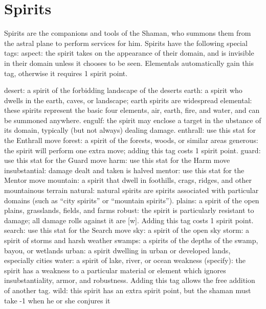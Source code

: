 


\section{Spirits}

Spirits are the companions and tools of the Shaman, who summons them from the astral plane to perform services for him. Spirits have the following special tags: aspect: the spirit takes on the appearance of their domain, and is invisible in their domain unless it chooses to be seen. Elementals automatically gain this tag, otherwise it requires 1 spirit point.

desert: a spirit of the forbidding landscape of the deserts
earth: a spirit who dwells in the earth, caves, or landscape; earth spirits are widespread
elemental: these spirits represent the basic four elements, air, earth, fire, and water, and can be summoned anywhere.
engulf: the spirit may enclose a target in the ubstance of its domain, typically (but not always) dealing damage.
enthrall: use this stat for the Enthrall move
forest: a spirit of the forests, woods, or similar areas
generous: the spirit will perform one extra move; adding this tag costs 1 spirit point.
guard: use this stat for the Guard move
harm: use this stat for the Harm move
insubstantial: damage dealt and taken is halved
mentor: use this stat for the Mentor move
mountain: a spirit that dwell in foothills, crags, ridges, and other mountainous terrain
natural: natural spirits are spirits associated with particular domains (such as “city spirits” or “mountain spirits”).
plains: a spirit of the open plains, grasslands, fields, and farms
robust: the spirit is particularly resistant to damage; all damage rolls against it are [w]. Adding this tag costs 1 spirit point.
search: use this stat for the Search move
sky: a spirit of the open sky
storm: a spirit of storms and harsh weather
swamps: a spirits of the depths of the swamp, bayou, or wetlands
urban: a spirit dwelling in urban or developed lands, especially cities
water: a spirit of lake, river, or ocean
weakness (specify): the spirit has a weakness to a particular material or element which ignores insubstantiality, armor, and robustness. Adding this tag allows the free addition of another tag.
wild: this spirit has an extra spirit point, but the shaman must take -1 when he or she conjures it


